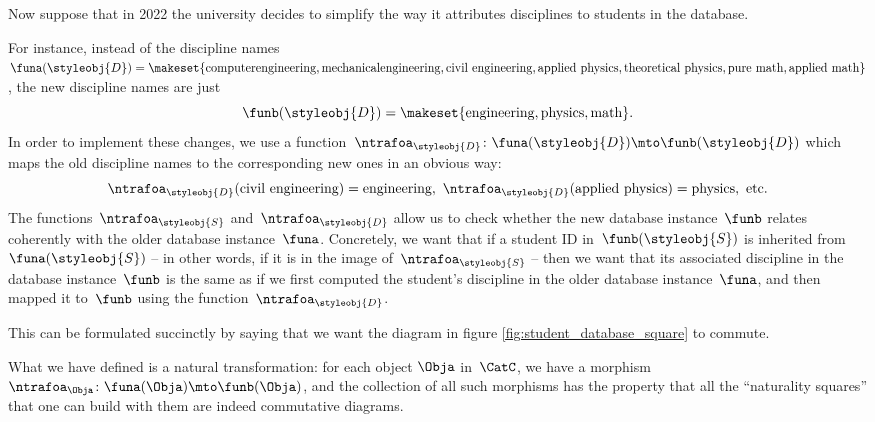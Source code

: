 Now suppose that in 2022 the university decides to simplify the way it attributes disciplines to students in the database.

For instance, instead of the discipline names~$\funa(\styleobj{D}) = \makeset{ \text{computer} \text{engineering}, 
\text{mechanical} \text{engineering}, \text{civil}\ \text{engineering}, \text{applied}\ \text{physics}, \text{theoretical}\ \text{physics}, \text{pure}\ \text{math}, \linebreak[1]\text{applied}\ \text{math} }$, the new discipline names are just
%
\begin{equation}
    \funb(\styleobj{D}) = \makeset{ \text{engineering}, \text{physics}, \text{math} }.
\end{equation}
%
In order to implement these changes, we use a function~$\ntrafoa_{\styleobj{D}}\colon \funa(\styleobj{D}) \mto \funb(\styleobj{D})$ which maps the old discipline names to the corresponding new ones in an obvious way:
\begin{equation}
    \ntrafoa_{\styleobj{D}}(\text{civil engineering}) = \text{engineering}, \ \ntrafoa_{\styleobj{D}}(\text{applied physics}) = \text{physics}, \ \text{etc.}
\end{equation}
The functions~$\ntrafoa_\styleobj{S}$ and~$\ntrafoa_\styleobj{D}$ allow us to check whether the new database instance~$\funb$ relates coherently with the older database instance~$\funa$.
Concretely, we want that if a student ID in~$\funb(\styleobj{S})$ is inherited from~$\funa(\styleobj{S})$ -- in other words, if it is in the image of~$\ntrafoa_{\styleobj{S}}$ -- then we want that its associated discipline in the database instance~$\funb$ is the same as if we first computed the student's discipline in the older database instance~$\funa$, and then mapped it to~$\funb$ using the function~$\ntrafoa_{\styleobj{D}}$.

%
\begin{marginfigure}
    \centering
    \caption{}
    \label{fig:student_database_square}
\end{marginfigure}
%

This can be formulated succinctly by saying that we want the diagram in figure \cref{fig:student_database_square} to commute.

What we have defined is a natural transformation: for each object $\Obja$ in~$\CatC$, we have a morphism~$\ntrafoa_\Obja \colon \funa(\Obja) \mto \funb(\Obja)$, and the collection of all such morphisms has the property that all the ``naturality squares'' that one can build with them are indeed commutative diagrams.



